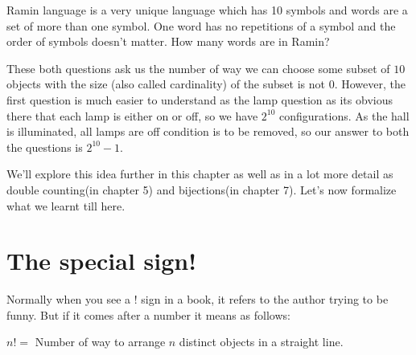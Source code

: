 \begin{example}
    Ramin language is a very unique language which has 10 symbols and words are a set of more than one symbol. 
    One word has no repetitions of a symbol and the order of symbols doesn't matter. How many words are in Ramin?
\end{example}

These both questions ask us the number of way we can choose some subset of $10$ objects with the size
(also called cardinality) of the subset is not $0$. However, 
the first question is much easier to understand as the lamp question as 
its obvious there that each lamp is either on or off, so we have $2^{10}$ configurations. 
As the hall is illuminated, all lamps are off condition is to be removed, so our answer to 
both the questions is $2^{10}-1$.\par
We'll explore this idea further in this chapter as well as in a lot more detail as 
double counting(in chapter 5) and bijections(in chapter 7). Let's now formalize what we learnt till here.
\section{The special sign!}
Normally when you see a ! sign in a book, it refers to the author trying to be funny. 
But if it comes after a number it means as follows:

\begin{definition}
    [Factorial]
    $n!=$ Number of way to arrange $n$ distinct objects in a straight line.
\end{definition}

